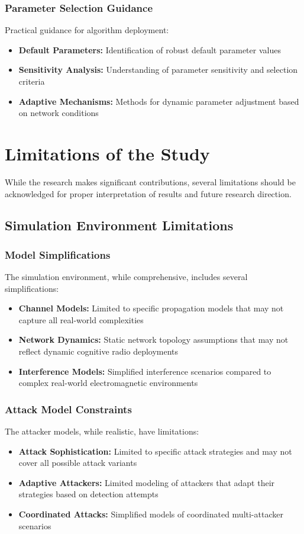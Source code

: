\subsubsection{Parameter Selection Guidance}
Practical guidance for algorithm deployment:
\begin{itemize}
\item \textbf{Default Parameters:} Identification of robust default parameter values
\item \textbf{Sensitivity Analysis:} Understanding of parameter sensitivity and selection criteria
\item \textbf{Adaptive Mechanisms:} Methods for dynamic parameter adjustment based on network conditions
\end{itemize}

\section{Limitations of the Study}
While the research makes significant contributions, several limitations should be acknowledged for proper interpretation of results and future research direction.

\subsection{Simulation Environment Limitations}

\subsubsection{Model Simplifications}
The simulation environment, while comprehensive, includes several simplifications:
\begin{itemize}
\item \textbf{Channel Models:} Limited to specific propagation models that may not capture all real-world complexities
\item \textbf{Network Dynamics:} Static network topology assumptions that may not reflect dynamic cognitive radio deployments
\item \textbf{Interference Models:} Simplified interference scenarios compared to complex real-world electromagnetic environments
\end{itemize}

\subsubsection{Attack Model Constraints}
The attacker models, while realistic, have limitations:
\begin{itemize}
\item \textbf{Attack Sophistication:} Limited to specific attack strategies and may not cover all possible attack variants
\item \textbf{Adaptive Attackers:} Limited modeling of attackers that adapt their strategies based on detection attempts
\item \textbf{Coordinated Attacks:} Simplified models of coordinated multi-attacker scenarios
\end{itemize}

